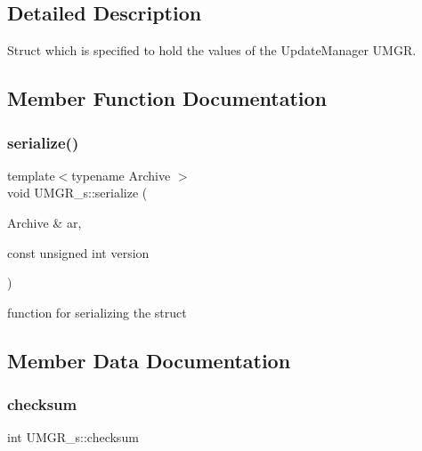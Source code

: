 \subsection{Detailed Description}
Struct which is specified to hold the values of the Update\+Manager U\+M\+GR. 

\subsection{Member Function Documentation}
\mbox{\label{structUMGR__s_af85ccf0554e33a7f7163c0d26ca791eb}} 
\subsubsection{\texorpdfstring{serialize()}{serialize()}}
{\footnotesize\ttfamily template$<$typename Archive $>$ \\
void U\+M\+G\+R\+\_\+s\+::serialize (\begin{DoxyParamCaption}\item[{Archive \&}]{ar,  }\item[{const unsigned int}]{version }\end{DoxyParamCaption})\hspace{0.3cm}{\ttfamily [inline]}}



function for serializing the struct 



\subsection{Member Data Documentation}
\mbox{\label{structUMGR__s_a3a98cb14c2b8c9545aa47871865076e6}} 
\subsubsection{\texorpdfstring{checksum}{checksum}}
{\footnotesize\ttfamily int U\+M\+G\+R\+\_\+s\+::checksum}

\mbox{\label{structUMGR__s_a80540aaa70f1333ba3c558f6af7a39a1}} 
